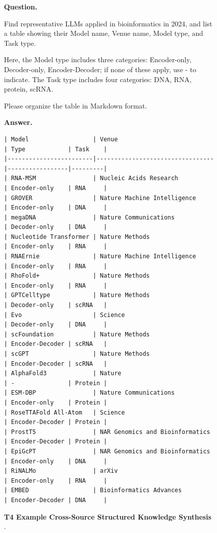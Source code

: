 \begin{figure}[t]
\centering
\begin{examplebox}
\textbf{Question.}

Find representative LLMs applied in bioinformatics in 2024, and list a table showing their Model name, Venue name, Model type, and Task type.

Here, the Model type includes three categories: Encoder-only, Decoder-only, Encoder-Decoder; if none of these apply, use - to indicate.
The Task type includes four categories: DNA, RNA, protein, scRNA.

Please organize the table in Markdown format.

\vspace{0.5em}
\textbf{Answer.}

\begingroup
\footnotesize
\setlength{\tabcolsep}{3pt}
\begin{verbatim}
| Model                  | Venue                           | Type            | Task    |
|------------------------|---------------------------------|-----------------|---------|
| RNA-MSM                | Nucleic Acids Research          | Encoder-only    | RNA     |
| GROVER                 | Nature Machine Intelligence     | Encoder-only    | DNA     |
| megaDNA                | Nature Communications           | Decoder-only    | DNA     |
| Nucleotide Transformer | Nature Methods                  | Encoder-only    | RNA     |
| RNAErnie               | Nature Machine Intelligence     | Encoder-only    | RNA     |
| RhoFold+               | Nature Methods                  | Encoder-only    | RNA     |
| GPTCelltype            | Nature Methods                  | Decoder-only    | scRNA   |
| Evo                    | Science                         | Decoder-only    | DNA     |
| scFoundation           | Nature Methods                  | Encoder-Decoder | scRNA   |
| scGPT                  | Nature Methods                  | Encoder-Decoder | scRNA   |
| AlphaFold3             | Nature                          | -               | Protein |
| ESM-DBP                | Nature Communications           | Encoder-only    | Protein |
| RoseTTAFold All-Atom   | Science                         | Encoder-Decoder | Protein |
| ProstT5                | NAR Genomics and Bioinformatics | Encoder-Decoder | Protein |
| EpiGcPT                | NAR Genomics and Bioinformatics | Encoder-only    | DNA     |
| RiNALMo                | arXiv                           | Encoder-only    | RNA     |
| EMBED                  | Bioinformatics Advances         | Encoder-Decoder | DNA     |
\end{verbatim}
\endgroup
\end{examplebox}
\caption{\textbf{T4 Example Cross-Source Structured Knowledge Synthesis
}.}
\label{fig:example-t4}
\end{figure}


